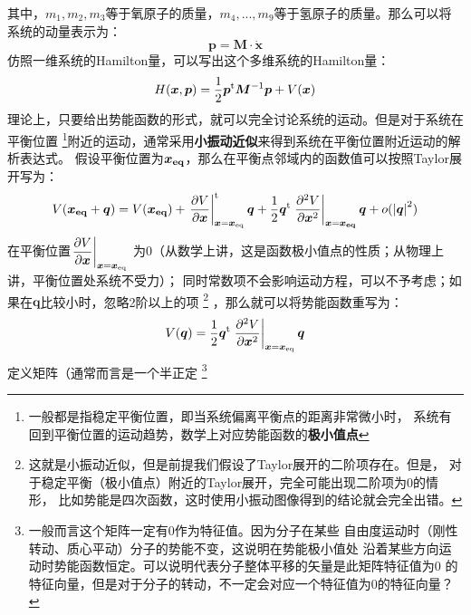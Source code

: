     其中，$m_1,m_2,m_3$等于氧原子的质量，$m_4,...,m_9$等于氢原子的质量。那么可以将
    系统的动量表示为：
    \begin{equation}
        \bm{p} = \bm{M}\cdot\dot{\bm{x}}
    \end{equation}
    仿照一维系统的Hamilton量，可以写出这个多维系统的Hamilton量：
    \begin{equation}
        H(\bm{x}, \bm{p}) = \frac{1}{2}\bm{p}^{\mathrm{t}}\bm{M}^{-1}\bm{p} + V(\bm{x})
    \end{equation}
    理论上，只要给出势能函数的形式，就可以完全讨论系统的运动。但是对于系统在平衡位置
    \footnote{一般都是指稳定平衡位置，即当系统偏离平衡点的距离非常微小时，
    系统有回到平衡位置的运动趋势，数学上对应势能函数的\textbf{极小值点}
    }附近的运动，通常采用\textbf{小振动近似}来得到系统在平衡位置附近运动的解析表达式。
    假设平衡位置为$\bm{x_{\mathrm{eq}}}$，那么在平衡点邻域内的函数值可以按照Taylor展开写为：
    \begin{equation}
        \begin{split}
        V(\bm{x_{\mathrm{eq}}} + \bm{q}) &= V(\bm{x_{\mathrm{eq}}}) + \left.\frac{\partial{V}}{\partial{\bm{x}}}\right|_{\bm{x} = \bm{x}_{\mathrm{eq}}}^{\mathrm{t}}\bm{q}
         + \frac{1}{2}\bm{q}^{\mathrm{t}}\left.\frac{\partial{^2V}}{\partial{\bm{x}^2}}\right|_{\bm{x} = \bm{x_{\mathrm{eq}}}}\bm{q} + o(\left|\bm{q}\right|^2)\\
        \end{split}
    \end{equation}
    在平衡位置$\displaystyle\left.\frac{\partial{V}}{\partial{\bm{x}}}\right|_{\bm{x} = \bm{x}_{\mathrm{eq}}}$
    为0（从数学上讲，这是函数极小值点的性质；从物理上讲，平衡位置处系统不受力）；
    同时常数项不会影响运动方程，可以不予考虑；如果在$\bm{q}$比较小时，忽略2阶以上的项
    \footnote{这就是小振动近似，但是前提我们假设了Taylor展开的二阶项存在。但是，
    对于稳定平衡（极小值点）附近的Taylor展开，完全可能出现二阶项为0的情形，
    比如势能是四次函数，这时使用小振动图像得到的结论就会完全出错。
    }
    ，那么就可以将势能函数重写为：
    \begin{equation}
        V(\bm{q}) = \frac{1}{2}\bm{q}^{\mathrm{t}}\left.\frac{\partial{^2V}}{\partial{\bm{x}^2}}\right|_{\bm{x} = \bm{x}_{\mathrm{eq}}}\bm{q}
        \label{potential at equilibrium point}
    \end{equation}
    定义矩阵（通常而言是一个半正定
    \footnote{
        一般而言这个矩阵一定有0作为特征值。因为分子在某些
        自由度运动时（刚性转动、质心平动）分子的势能不变，这说明在势能极小值处
        沿着某些方向运动时势能函数恒定。可以说明代表分子整体平移的矢量是此矩阵特征值为0
        的特征向量，但是对于分子的转动，不一定会对应一个特征值为0的特征向量？
    }
